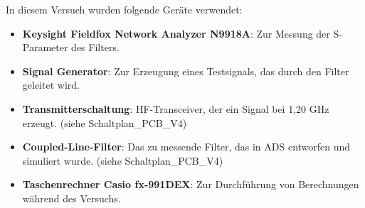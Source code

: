 In diesem Versuch wurden folgende Geräte verwendet:
\begin{itemize}
    \item \textbf{Keysight Fieldfox Network Analyzer N9918A}: Zur Messung der S-Parameter des Filters.
    \item \textbf{Signal Generator}: Zur Erzeugung eines Testsignals, das durch den Filter geleitet wird.
    \item \textbf{Transmitterschaltung}: HF-Transceiver, der ein Signal bei 1,20 GHz erzeugt. (siehe Schaltplan\_PCB\_V4)
    \item \textbf{Coupled-Line-Filter}: Das zu messende Filter, das in ADS entworfen und simuliert wurde. (siehe Schaltplan\_PCB\_V4)
    \item \textbf{Taschenrechner Casio fx-991DEX}: Zur Durchführung von Berechnungen während des Versuchs.
\end{itemize}
\clearpage